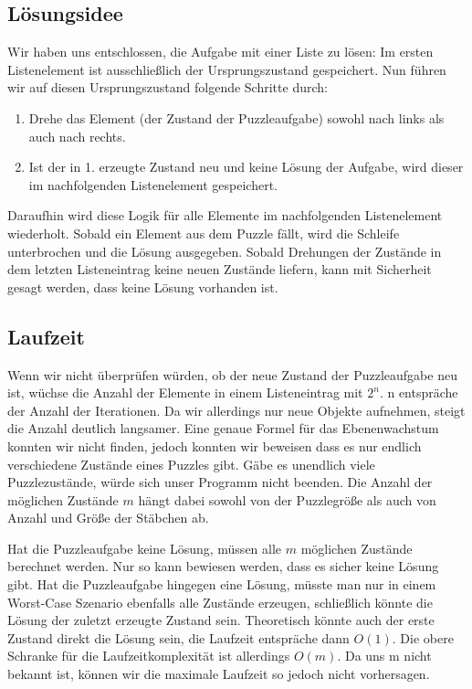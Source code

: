 \subsection {Lösungsidee}
	Wir haben uns entschlossen, die Aufgabe mit einer Liste zu lösen: 
	Im ersten Listenelement ist ausschließlich der Ursprungszustand gespeichert. Nun führen wir auf diesen Ursprungszustand folgende Schritte durch:

	\begin{enumerate}
		\item Drehe das Element (der Zustand der Puzzleaufgabe) sowohl nach links als auch nach rechts.
		\item Ist der in 1. erzeugte Zustand neu und keine Lösung der Aufgabe, wird dieser im nachfolgenden Listenelement gespeichert.
	\end{enumerate}

	Daraufhin wird diese Logik für alle Elemente im nachfolgenden Listenelement wiederholt.
	Sobald ein Element aus dem Puzzle fällt, wird die Schleife unterbrochen und die Lösung ausgegeben. Sobald Drehungen der Zustände in dem letzten Listeneintrag keine neuen Zustände liefern, kann mit Sicherheit gesagt werden, dass keine Lösung vorhanden ist.

\subsection{Laufzeit}
	Wenn wir nicht überprüfen würden, ob der neue Zustand der Puzzleaufgabe neu ist, wüchse die Anzahl der Elemente in einem Listeneintrag mit \(2^n\).  
	n entspräche der Anzahl der Iterationen. Da wir allerdings nur neue Objekte aufnehmen, steigt die Anzahl deutlich langsamer.
	Eine genaue Formel für das Ebenenwachstum konnten wir nicht finden, jedoch konnten wir beweisen dass es nur endlich verschiedene Zustände eines Puzzles gibt. Gäbe es unendlich viele Puzzlezustände, würde sich unser Programm nicht beenden. Die Anzahl der möglichen Zustände \(m\) hängt dabei sowohl von der Puzzlegröße als auch von Anzahl und Größe der Stäbchen ab.

	Hat die Puzzleaufgabe keine Lösung, müssen alle \(m\) möglichen Zustände berechnet werden. Nur so kann bewiesen werden, dass es sicher keine Lösung gibt.
	Hat die Puzzleaufgabe hingegen eine Lösung, müsste man nur in einem Worst-Case Szenario ebenfalls alle  Zustände erzeugen, schließlich könnte die Lösung der zuletzt erzeugte Zustand sein. Theoretisch könnte auch der erste Zustand direkt die Lösung sein, die Laufzeit entspräche dann \(O(1)\).
	Die obere Schranke für die Laufzeitkomplexität ist allerdings \(O(m)\). Da uns m nicht bekannt ist, können wir die maximale Laufzeit so jedoch nicht vorhersagen.

